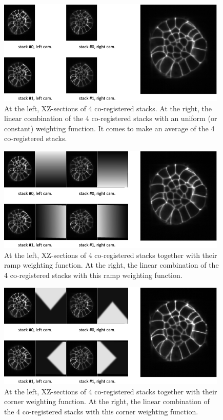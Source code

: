 \begin{figure}
\begin{center}
\includegraphics[height=50mm]{figures/fusion-uniform-combination.png}
\end{center}
\caption{\label{fig:cli:fuse:uniform:combination} At the left, XZ-sections of 4 co-registered stacks. 
At the right, the linear combination of the 4 co-registered stacks with an uniform (or constant) weighting function. It comes to make an average of the 4 co-registered stacks.}
\end{figure}

\begin{figure}
\begin{center}
\includegraphics[height=50mm]{figures/fusion-ramp-combination.png}
\end{center}
\caption{\label{fig:cli:fuse:ramp:combination} At the left, XZ-sections of 4 co-registered stacks together with their ramp weighting function.
At the right, the linear combination of the 4 co-registered stacks with this ramp weighting function.}
\end{figure}

\begin{figure}
\begin{center}
\includegraphics[height=50mm]{figures/fusion-corner-combination.png}
\end{center}
\caption{\label{fig:cli:fuse:corner:combination} At the left, XZ-sections of 4 co-registered stacks together with their corner weighting function.
At the right, the linear combination of the 4 co-registered stacks with this corner weighting function.}
\end{figure}


